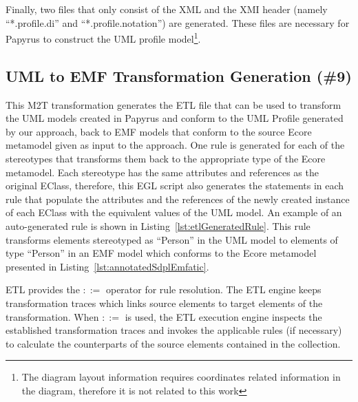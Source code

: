 Finally, two files that only consist of the XML and the XMI header (namely ``*.profile.di'' and ``*.profile.notation'') are generated. 
These files are necessary for Papyrus to construct the UML profile model\footnote{The diagram layout information requires coordinates related information in the diagram, therefore it is not related to this work}. 

\subsection{UML to EMF Transformation Generation (\#9)}
\label{sec:uml2emf}
This M2T transformation generates the ETL file that can be used to transform the UML models created in Papyrus and conform to the UML Profile generated by our approach, back to EMF models that conform to the source Ecore metamodel given as input to the approach. 
One rule is generated for each of the stereotypes that transforms them back to the appropriate type of the Ecore metamodel. 
Each stereotype has the same attributes and references as the original EClass, therefore, this EGL script also generates the statements in each rule that populate the attributes and the references of the newly created instance of each EClass with the equivalent values of the UML model. 
An example of an auto-generated rule is shown in Listing~\ref{lst:etlGeneratedRule}. 
This rule transforms elements stereotyped as ``Person'' in the UML model to elements of type ``Person'' in an EMF model which conforms to the Ecore metamodel presented in Listing~\ref{lst:annotatedSdplEmfatic}.




ETL provides the $::=$ operator for rule resolution. 
The ETL engine keeps transformation traces which links source elements to target elements of the transformation. 
When $::=$ is used, the ETL execution engine inspects the established transformation traces and invokes the applicable rules (if necessary) to calculate the counterparts of the source elements contained in the collection. 

